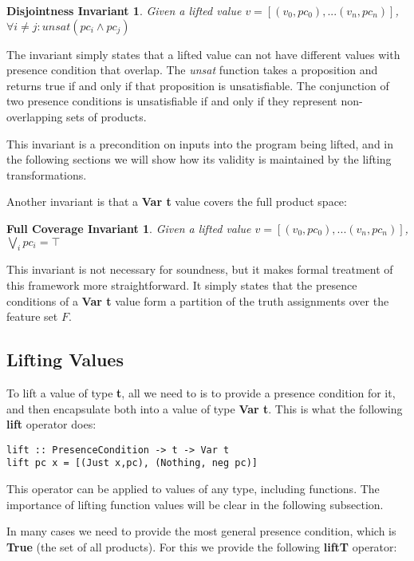 \documentclass[10pt,conference]{llncs}
\begin{document}
\newtheorem*{disjInv*}{Disjointness Invariant}
\begin{disjInv*}
Given a lifted value $v = [(v_0, pc_0), ... (v_n, pc_n)]$, $\forall i \neq j: {unsat (pc_i \wedge pc_j)}$
\end{disjInv*}

The invariant simply states that a lifted value can not have different values with presence condition that overlap. The \emph{unsat} function takes a proposition and returns true if and only if that proposition is unsatisfiable. The conjunction of two presence conditions is unsatisfiable if and only if they represent non-overlapping sets of products.

This invariant is a precondition on inputs into the program being lifted, and in the following sections we will show how its validity is maintained by the lifting transformations.

Another invariant is that a \textbf{Var t} value covers the full product space:

\newtheorem*{covInv*}{Full Coverage Invariant}
\begin{covInv*}
Given a lifted value $v = [(v_0, pc_0), ... (v_n, pc_n)]$, $\bigvee_{i} pc_i = \top $
\end{covInv*}

This invariant is not necessary for soundness, but it makes formal treatment of this framework more straightforward. It simply states that the presence conditions of a \textbf{Var t} value form a partition of the truth assignments over the feature set $F$.

\subsection{Lifting Values}

To lift a value of type \textbf{t}, all we need to is to provide a presence condition for it, and then encapsulate both into a value of type \textbf{Var t}. This is what the following \textbf{lift} operator does:

\begin{verbatim}
lift :: PresenceCondition -> t -> Var t
lift pc x = [(Just x,pc), (Nothing, neg pc)]
\end{verbatim}

This operator can be applied to values of any type, including functions. The importance of lifting function values will be clear in the following subsection.

In many cases we need to provide the most general presence condition, which is \textbf{True} (the set of all products). For this we provide the following \textbf{liftT} operator:
\end{document}
